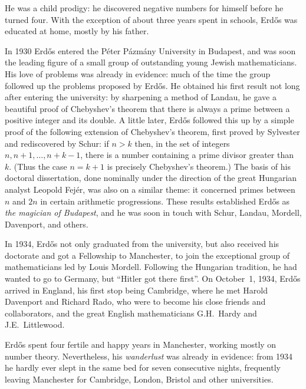 \documentclass[a6paper]{article}
\begin{document}
He was a child prodigy:  
he discovered negative numbers for himself before he turned four. With
the exception of about three years spent in schools, Erd\H{o}s 
was educated at home, mostly by his father. 

In 1930 Erd\H{o}s entered the P\'eter P\'azm\'any University in 
Budapest, and was soon 
the leading figure of a small group of outstanding 
young Jewish mathematicians. His love of problems was already in 
evidence: much of the time the group followed up the problems proposed 
by Erd\H{o}s. He obtained his first  result not long after entering the
university:  by sharpening a method of Landau, he gave a beautiful
proof of Chebyshev's theorem that there is always a prime between a
positive integer and its double.   A little later, Erd\H{o}s followed 
this up by a
simple proof of the following extension of Chebyshev's theorem, 
first proved by Sylvester and rediscovered by Schur:  
if $n>k$ then, in the set of
integers $n,n+1,\ldots,n+k-1$, there is a number containing a prime
divisor greater than~$k$.  (Thus the case $n=k+1$ is precisely Chebyshev's
theorem.)  The basis of his doctoral dissertation, done nominally
under the direction of the great Hungarian analyst Leopold Fej\'er,
was also on a similar theme:  it concerned primes between $n$ and $2n$
in certain arithmetic progressions. 
These results established Erd\H{o}s as {\it the magician of Budapest},
and he was soon in touch with Schur, Landau, Mordell, Davenport, and
others.

In 1934, Erd\H{o}s not only graduated from the university, but also
received his doctorate and got a Fellowship to Manchester, to join the
exceptional group of mathematicians led by Louis Mordell.  Following the 
Hungarian tradition, he had wanted to go to Germany, but ``Hitler got 
there first''. On October~1, 1934, 
Erd\H{o}s arrived in England, his first stop being
Cambridge, where he met Harold Davenport and Richard Rado, who were to
become his close friends and collaborators, and the great English
mathematicians G.H.~Hardy and J.E.~Littlewood.

Erd\H{o}s spent four fertile and happy years in Manchester, working
mostly on number theory.  Nevertheless, his {\it wanderlust} was already in
evidence:  from 1934 he hardly ever slept in the same bed for seven
consecutive nights, frequently leaving Manchester for Cambridge, 
London, Bristol
and other universities.
\end{document}
